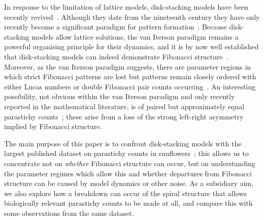 \documentclass[a4paper,10pt]{amsart}
\begin{document}
In response to the limitation of lattice models, disk-stacking models have been recently revived~\cite{atelaDynamicalSystemPlant2002}. Although they date from the nineteenth century they have only recently become a significant paradigm for pattern formation~\cite{godinPhyllotaxisGeometricCanalization2020,goleFibonacciQuasisymmetricPhyllotaxis2016}. Because disk-stacking models allow lattice solutions,  the van Iterson paradigm remains a powerful organising principle for their dynamics, and it is by now well established that disk-stacking models can indeed demonstrate Fibonacci structure~\cite{goleFibonacciQuasisymmetricPhyllotaxis2016}. Moreover, as the van Iterson paradigm suggests, there are parameter regions in which strict Fibonacci patterns are lost but patterns remain closely ordered with either Lucas numbers or double Fibonacci pair counts occurring~\cite{goleFibonacciQuasisymmetricPhyllotaxis2016,yonekuraMathematicalModelStudies2019}. An interesting possibility, not obvious within the van Iterson paradigm and only recently reported in the mathematical literature, is of paired but approximately equal parastichy counts~\cite{goleFibonacciQuasisymmetricPhyllotaxis2016}; these arise from a loss of the strong left-right asymmetry implied by Fibonacci structure. 

The main purpose of this paper is to confront disk-stacking models with the largest published dataset on parastichy counts in sunflowers~\cite{swintonNovelFibonacciNonFibonacci2016}; this allows us to  concentrate not on \textit{whether} Fibonacci structure can occur, but on understanding the parameter regimes which allow this and whether departures from Fibonacci structure can be caused by model dynamics or other noise. 
As a subsidiary aim, we also explore how a breakdown can occur of the spiral structure that allows biologically relevant parastichy counts to be made at all, and compare this with some observations from the same dataset. 
\end{document}
